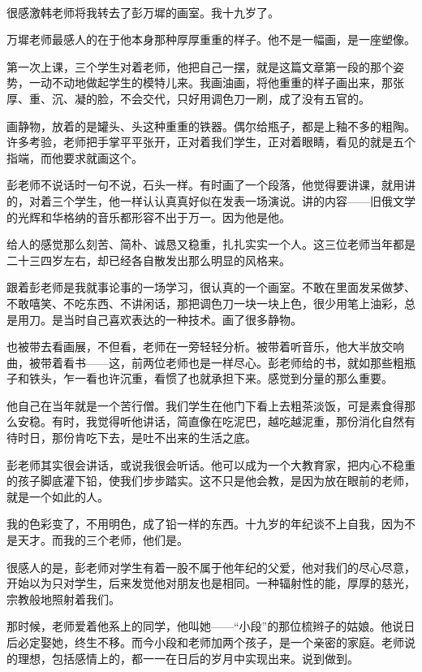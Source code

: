 \par  
\par 很感激韩老师将我转去了彭万墀的画室。我十九岁了。
\par 万墀老师最感人的在于他本身那种厚厚重重的样子。他不是一幅画，是一座塑像。
\par 第一次上课，三个学生对着老师，他把自己一摆，就是这篇文章第一段的那个姿势，一动不动地做起学生的模特儿来。我画油画，将他重重的样子画出来，那张厚、重、沉、凝的脸，不会交代，只好用调色刀一刷，成了没有五官的。
\par 画静物，放着的是罐头、头这种重重的铁器。偶尔给瓶子，都是上釉不多的粗陶。许多考验，老师把手掌平平张开，正对着我们学生，正对着眼睛，看见的就是五个指端，而他要求就画这个。
\par 彭老师不说话时一句不说，石头一样。有时画了一个段落，他觉得要讲课，就用讲的，对着三个学生，他一样认认真真好似在发表一场演说。讲的内容——旧俄文学的光辉和华格纳的音乐都形容不出于万一。因为他是他。
\par 给人的感觉那么刻苦、简朴、诚恳又稳重，扎扎实实一个人。这三位老师当年都是二十三四岁左右，却已经各自散发出那么明显的风格来。
\par 跟着彭老师是我就事论事的一场学习，很认真的一个画室。不敢在里面发呆做梦、不敢嘻笑、不吃东西、不讲闲话，那把调色刀一块一块上色，很少用笔上油彩，总是用刀。是当时自己喜欢表达的一种技术。画了很多静物。
\par 也被带去看画展，不但看，老师在一旁轻轻分析。被带着听音乐，他大半放交响曲，被带着看书——这，前两位老师也是一样尽心。彭老师给的书，就如那些粗瓶子和铁头，乍一看也许沉重，看惯了也就承担下来。感觉到分量的那么重要。
\par 他自己在当年就是一个苦行僧。我们学生在他门下看上去粗茶淡饭，可是素食得那么安稳。有时，我觉得听他讲话，简直像在吃泥巴，越吃越泥重，那份消化自然有待时日，那份肯吃下去，是吐不出来的生活之底。
\par 彭老师其实很会讲话，或说我很会听话。他可以成为一个大教育家，把内心不稳重的孩子脚底灌下铅，使我们步步踏实。这不只是他会教，是因为放在眼前的老师，就是一个如此的人。
\par 我的色彩变了，不用明色，成了铅一样的东西。十九岁的年纪谈不上自我，因为不是天才。而我的三个老师，他们是。
\par 很感人的是，彭老师对学生有着一股不属于他年纪的父爱，他对我们的尽心尽意，开始以为只对学生，后来发觉他对朋友也是相同。一种辐射性的能，厚厚的慈光，宗教般地照射着我们。
\par 那时候，老师爱着他系上的同学，他叫她——“小段”的那位梳辫子的姑娘。他说日后必定娶她，终生不移。而今小段和老师加两个孩子，是一个亲密的家庭。老师说的理想，包括感情上的，都一一在日后的岁月中实现出来。说到做到。
